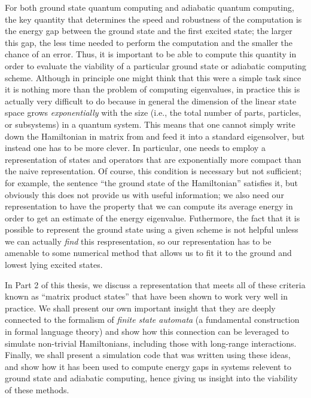\documentclass[12pt]{amsbook}
\theoremstyle{plain}
\theoremstyle{definition}
\theoremstyle{remark}
\begin{document}
For both ground state quantum computing and adiabatic quantum computing, the key quantity that determines the speed and robustness of the computation is the energy gap between the ground state and the first excited state;  the larger this gap, the less time needed to perform the computation and the smaller the chance of an error.  Thus, it is important to be able to compute this quantity in order to evaluate the viability of a particular ground state or adiabatic computing scheme.  Although in principle one might think that this were a simple task since it is nothing more than the problem of computing eigenvalues, in practice this is actually very difficult to do because in general the dimension of the linear state space grows \emph{exponentially} with the size (i.e., the total number of parts, particles, or subsystems) in a quantum system.  This means that one cannot simply write down the Hamiltonian in matrix from and feed it into a standard eigensolver, but instead one has to be more clever.  In particular, one needs to employ a representation of states and operators that are exponentially more compact than the naive representation.  Of course,  this condition is necessary but not sufficient;  for example, the sentence ``the ground state of the Hamiltonian'' satisfies it, but obviously this does not provide us with useful information;  we also need our representation to have the property that we can compute its average energy in order to get an estimate of the energy eigenvalue.  Futhermore, the fact that it is possible to represent the ground state using a given scheme is not helpful unless we can actually \emph{find} this respresentation, so our representation has to be amenable to some numerical method that allows us to fit it to the ground and lowest lying excited states.

In Part 2 of this thesis, we discuss a representation that meets all of these criteria known as ``matrix product states'' that have been shown to work very well in practice.  We shall present our own important insight that they are deeply connected to the formalism of \emph{finite state automata} (a fundamental construction in formal language theory) and show how this connection can be leveraged to simulate non-trivial Hamiltonians, including those with long-range interactions.  Finally, we shall present a simulation code that was written using these ideas, and show how it has been used to compute energy gaps in systems relevent to ground state and adiabatic computing, hence giving us insight into the viability of these methods.
\end{document}
